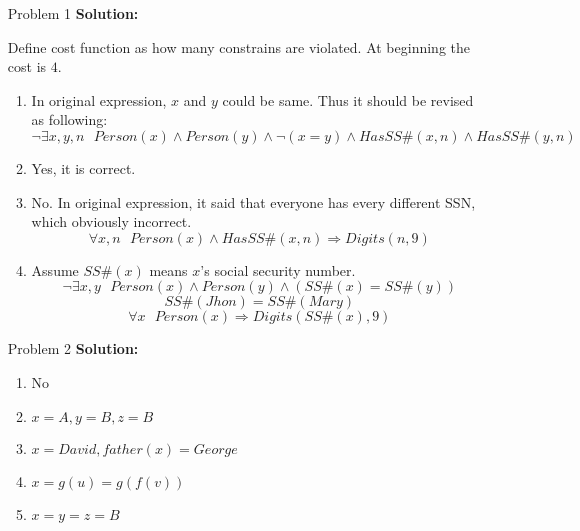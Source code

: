 \normalfont\documentclass[letterpaper,11pt]{article}
\begin{document}
\setlength{\parindent}{2ex}
\newcommand{\header}{
	\noindent {}
}
\bigskip
\header

\begin{enumerate}
\item[Problem 1]\textbf{Solution:}\par
	Define cost function as how many constrains are violated. At beginning the cost is $4$.
	\begin{enumerate}
		\item \par
			In original expression, $x$ and $y$ could be same. Thus it should be revised as following:
			$$\neg \exists x,y,n\text{ }Person(x) \land Person(y) \land \neg(x = y) \land HasSS\#(x,n) \land HasSS\#(y,n)$$ 
		\item \par
			Yes, it is correct.
		\item \par
			No. In original expression, it said that everyone has every different SSN, which obviously incorrect.
			$$\forall x,n\text{ }Person(x) \land HasSS\#(x,n) \Rightarrow Digits(n,9)$$
		\item \par
		Assume $SS\#(x)$ means $x$'s social security number.
		$$\neg \exists x,y\text{ }Person(x) \land Person(y) \land (SS\#(x) = SS\#(y))$$
		$$SS\#(Jhon) = SS\#(Mary)$$
		$$\forall x\text{ }Person(x) \Rightarrow Digits(SS\#(x),9)$$
	\end{enumerate}
\item[Problem 2]\textbf{Solution:}\par
	\begin{enumerate}
		\item No
		\item $x = A, y = B , z = B$
		\item $x = David, father(x) = George$
		\item $x = g(u) = g(f(v))$
		\item $x = y = z = B$

\end{enumerate}
\end{enumerate}
\end{document}
